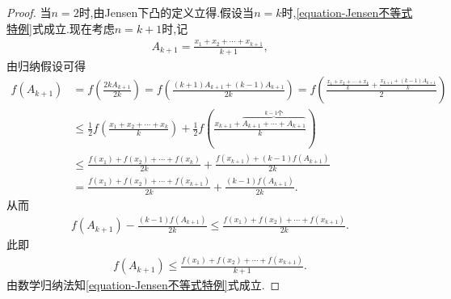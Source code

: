 \documentclass[../../main.tex]{subfiles}%
\begin{document}
\begin{proof}
当$n=2$时,由Jensen下凸的定义立得.假设当$n=k$时,\eqref{equation-Jensen不等式特例}式成立.现在考虑$n=k+1$时,记
\begin{align*}
A_{k+1}=\frac{x_1+x_2+\cdots +x_{k+1}}{k+1},
\end{align*}
由归纳假设可得
\begin{align*}
f\left( A_{k+1} \right) &=f\left( \frac{2kA_{k+1}}{2k} \right) =f\left( \frac{\left( k+1 \right) A_{k+1}+\left( k-1 \right) A_{k+1}}{2k} \right) =f\left( \frac{\frac{x_1+x_2+\cdots +x_k}{k}+\frac{x_{k+1}+\left( k-1 \right) A_{k+1}}{k}}{2} \right) 
\\
&\leqslant \frac{1}{2}f\left( \frac{x_1+x_2+\cdots +x_k}{k} \right) +\frac{1}{2}f\left( \frac{x_{k+1}+\overset{k-1\text{个}}{\overbrace{A_{k+1}+\cdots +A_{k+1}}}}{k} \right) 
\\
&\leqslant \frac{f\left( x_1 \right) +f\left( x_2 \right) +\cdots +f\left( x_k \right)}{2k}+\frac{f\left( x_{k+1} \right) +\left( k-1 \right) f\left( A_{k+1} \right)}{2k}
\\
&=\frac{f\left( x_1 \right) +f\left( x_2 \right) +\cdots +f\left( x_{k+1} \right)}{2k}+\frac{\left( k-1 \right) f\left( A_{k+1} \right)}{2k}.
\end{align*}
从而
\begin{align*}
f\left( A_{k+1} \right) -\frac{\left( k-1 \right) f\left( A_{k+1} \right)}{2k}\leqslant \frac{f\left( x_1 \right) +f\left( x_2 \right) +\cdots +f\left( x_{k+1} \right)}{2k}.
\end{align*}
此即
\begin{align*}
f\left( A_{k+1} \right) \leqslant \frac{f\left( x_1 \right) +f\left( x_2 \right) +\cdots +f\left( x_{k+1} \right)}{k+1}.
\end{align*}
由数学归纳法知\eqref{equation-Jensen不等式特例}式成立.


\end{proof}
\end{document}
